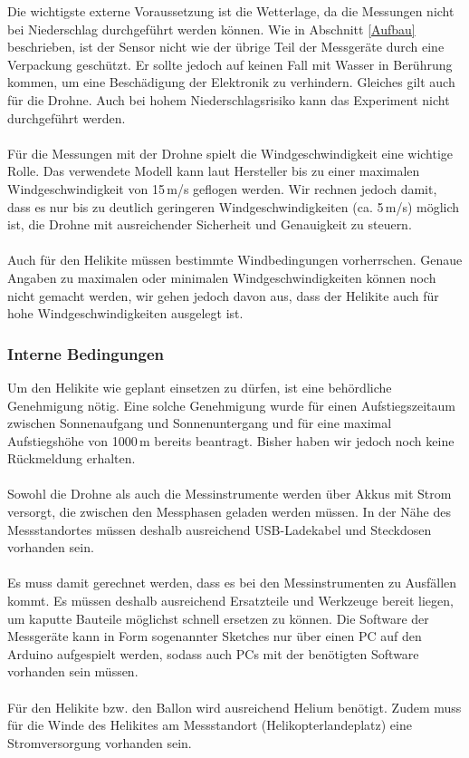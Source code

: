 \documentclass[a4paper,11pt,DIV=calc,tablecaptionabove,headinclude,twoside]{article}
\begin{document}
Die wichtigste externe Voraussetzung ist die Wetterlage, da die Messungen nicht bei Niederschlag durchgeführt werden können. Wie in Abschnitt \ref{Aufbau} beschrieben, ist der Sensor nicht wie der übrige Teil der Messgeräte durch eine Verpackung geschützt. Er sollte jedoch auf keinen Fall mit Wasser in Berührung kommen, um eine Beschädigung der Elektronik zu verhindern. Gleiches gilt auch für die Drohne. Auch bei hohem Niederschlagsrisiko kann das Experiment nicht durchgeführt werden. \\\\
Für die Messungen mit der Drohne spielt die Windgeschwindigkeit eine wichtige Rolle. Das verwendete Modell kann laut Hersteller bis zu einer maximalen Windgeschwindigkeit von 15\,m/s geflogen werden. Wir rechnen jedoch damit, dass es nur bis zu deutlich geringeren Windgeschwindigkeiten (ca. 5\,m/s) möglich ist, die Drohne mit ausreichender Sicherheit und Genauigkeit zu steuern. \\\\
Auch für den Helikite müssen bestimmte Windbedingungen vorherrschen. Genaue Angaben zu maximalen oder minimalen Windgeschwindigkeiten können noch nicht gemacht werden, wir gehen jedoch davon aus, dass der Helikite auch für hohe Windgeschwindigkeiten ausgelegt ist.

\subsubsection{Interne Bedingungen}

Um den Helikite wie geplant einsetzen zu dürfen, ist eine behördliche Genehmigung nötig. Eine solche Genehmigung wurde für einen Aufstiegszeitaum zwischen Sonnenaufgang und Sonnenuntergang und für eine maximal Aufstiegshöhe von 1000\,m bereits beantragt. Bisher haben wir jedoch noch keine Rückmeldung erhalten.\\\\
Sowohl die Drohne als auch die Messinstrumente werden über Akkus mit Strom versorgt, die zwischen den Messphasen geladen werden müssen. In der Nähe des Messstandortes müssen deshalb ausreichend USB-Ladekabel und Steckdosen vorhanden sein.\\\\
Es muss damit gerechnet werden, dass es bei den Messinstrumenten zu Ausfällen kommt. Es müssen deshalb ausreichend Ersatzteile und Werkzeuge bereit liegen, um kaputte Bauteile möglichst schnell ersetzen zu können. Die Software der Messgeräte kann in Form sogenannter Sketches nur über einen PC auf den Arduino aufgespielt werden, sodass auch PCs mit der benötigten Software vorhanden sein müssen.\\\\
Für den Helikite bzw. den Ballon wird ausreichend Helium benötigt. Zudem muss für die Winde des Helikites am Messstandort (Helikopterlandeplatz) eine Stromversorgung vorhanden sein.
\end{document}
